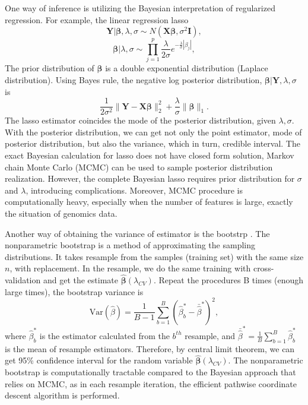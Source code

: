 One way of inference is utilizing the Bayesian interpretation of regularized regression. For example, the linear regression lasso
\begin{displaymath}
\bm{Y}|\bm{\beta}, \lambda,\sigma \sim N(\bm{X\beta}, \sigma^2\bm{I}),
\end{displaymath}
\begin{displaymath}
\bm{\beta}|\lambda,\sigma \sim \prod_{j=1}^p \frac{\lambda}{2\sigma}e^{-\frac{\lambda}{\sigma}|\beta_j|},
\end{displaymath}
The prior distribution of $\bm{\beta}$ is a double exponential distribution (Laplace distribution). Using Bayes rule, the negative log posterior distribution, $\bm{\beta}|\bm{Y},\lambda,\sigma$ is 
\begin{displaymath}
\frac{1}{2\sigma^2} \|\bm{Y}-\bm{X\beta}\|_2^2+\frac{\lambda}{\sigma}\|\bm{\beta}\|_1.
\end{displaymath}
The lasso estimator coincides the mode of the posterior distribution, given $\lambda,\sigma$. With the posterior distribution, we can get not only the point estimator, mode of posterior distribution, but also the variance, which in turn, credible interval. The exact Bayesian calculation for lasso does not have closed form solution, Markov chain Monte Carlo (MCMC) can be used to sample posterior distribution realization. However, the complete Bayesian lasso requires prior distribution for $\sigma$ and $\lambda$, introducing complications. Moreover, MCMC procedure is computationally heavy, especially when the number of features is large, exactly the situation of genomics data. 

Another way of obtaining the variance of estimator is the bootstrp \citep{efron1979bootstrap}. The nonparametric bootstrap is a method of approximating the sampling distributions. It takes resample from the samples (training set) with the same size $n$, with replacement. In the resample, we do the same training with cross-validation and get the estimate $\hat{\bm{\beta}}(\lambda_{CV})$. Repeat the procedures B times (enough large times), the bootstrap variance is 
\begin{displaymath}
\text{Var}(\hat{\beta})=\frac{1}{B-1}\sum_{b=1}^B(\hat{\beta}_b^*-\bar{\hat{\beta}}^*)^2,
\end{displaymath}
where $\hat{\beta}_b^*$ is the estimator calculated from the $b^{th}$ resample, and $\bar{\hat{\beta}}^* = \frac{1}{B}\sum_{b=1}^B\hat{\beta}_b^*$ is the mean of resample estimators. Therefore, by central limit theorem, we can get 95\% confidence interval for the random variable $\hat{\bm{\beta}}(\lambda_{CV})$. The nonparametric bootstrap is computationally tractable compared to the Bayesian approach that relies on MCMC, as in each resample iteration, the efficient pathwise coordinate descent algorithm is performed.

